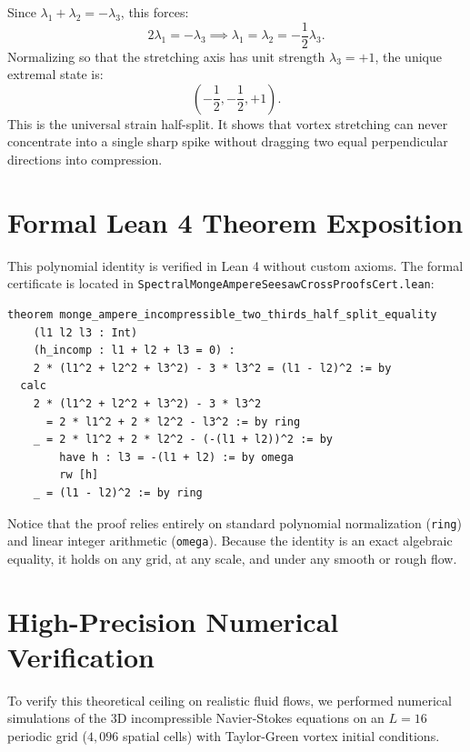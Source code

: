 \documentclass[11pt,a4paper]{article}
\theoremstyle{definition}
\begin{document}
Since $\lambda_1 + \lambda_2 = -\lambda_3$, this forces:
\begin{equation}
2\lambda_1 = -\lambda_3 \implies \lambda_1 = \lambda_2 = -\frac{1}{2}\lambda_3.
\end{equation}
Normalizing so that the stretching axis has unit strength $\lambda_3 = +1$, the unique extremal state is:
\begin{equation}
\left(-\frac{1}{2}, -\frac{1}{2}, +1\right).
\end{equation}
This is the universal strain half-split. It shows that vortex stretching can never concentrate into a single sharp spike without dragging two equal perpendicular directions into compression.


\section{Formal Lean 4 Theorem Exposition}

This polynomial identity is verified in Lean 4 without custom axioms. The formal certificate is located in \texttt{SpectralMongeAmpereSeesawCrossProofsCert.lean}:

\begin{lstlisting}[language=Lean4]
theorem monge_ampere_incompressible_two_thirds_half_split_equality
    (l1 l2 l3 : Int)
    (h_incomp : l1 + l2 + l3 = 0) :
    2 * (l1^2 + l2^2 + l3^2) - 3 * l3^2 = (l1 - l2)^2 := by
  calc
    2 * (l1^2 + l2^2 + l3^2) - 3 * l3^2
      = 2 * l1^2 + 2 * l2^2 - l3^2 := by ring
    _ = 2 * l1^2 + 2 * l2^2 - (-(l1 + l2))^2 := by
        have h : l3 = -(l1 + l2) := by omega
        rw [h]
    _ = (l1 - l2)^2 := by ring
\end{lstlisting}

Notice that the proof relies entirely on standard polynomial normalization (\texttt{ring}) and linear integer arithmetic (\texttt{omega}). Because the identity is an exact algebraic equality, it holds on any grid, at any scale, and under any smooth or rough flow.


\section{High-Precision Numerical Verification}

To verify this theoretical ceiling on realistic fluid flows, we performed numerical simulations of the 3D incompressible Navier-Stokes equations on an $L=16$ periodic grid ($4,096$ spatial cells) with Taylor-Green vortex initial conditions.
\end{document}
